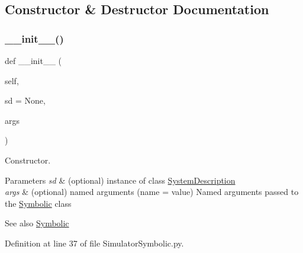 \subsection{Constructor \& Destructor Documentation}
\mbox{\label{classSignalIntegrity_1_1SystemDescriptions_1_1SimulatorSymbolic_1_1SimulatorSymbolic_a72fa31992e716f60779f561f6cdbb4ce}} 
\subsubsection{\texorpdfstring{\+\_\+\+\_\+init\+\_\+\+\_\+()}{\_\_init\_\_()}}
{\footnotesize\ttfamily def \+\_\+\+\_\+init\+\_\+\+\_\+ (\begin{DoxyParamCaption}\item[{}]{self,  }\item[{}]{sd = {\ttfamily None},  }\item[{}]{args }\end{DoxyParamCaption})}



Constructor. 


\begin{DoxyParams}{Parameters}
{\em sd} & (optional) instance of class \hyperlink{namespaceSignalIntegrity_1_1SystemDescriptions_1_1SystemDescription}{System\+Description} \\
\hline
{\em args} & (optional) named arguments (name = value) Named arguments passed to the \hyperlink{namespaceSignalIntegrity_1_1SystemDescriptions_1_1Symbolic}{Symbolic} class \\
\hline
\end{DoxyParams}
\begin{DoxySeeAlso}{See also}
\hyperlink{namespaceSignalIntegrity_1_1SystemDescriptions_1_1Symbolic}{Symbolic} 
\end{DoxySeeAlso}


Definition at line 37 of file Simulator\+Symbolic.\+py.



